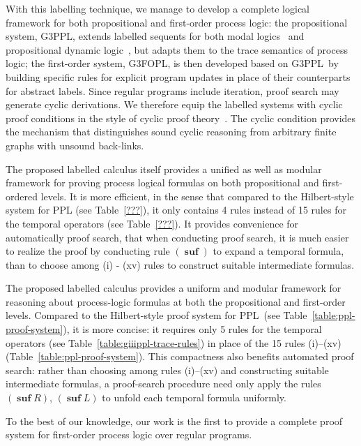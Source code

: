 \documentclass[manuscript,screen]{acmart}
\newcommand{\GiiiPPL}[0]{\mbox{G3PPL}}
\newcommand{\GiiiFOPL}[0]{\mbox{G3FOPL}}
\DeclareMathOperator{\osuf}{\mathbf{suf}}
\newcommand{\PPL}[0]{\mbox{PPL}}
\begin{document}
With this labelling technique, we manage to develop a complete logical framework for both propositional and first-order process logic: the propositional system, \GiiiPPL, extends labelled sequents for both modal logics~\cite{Negri05} and propositional dynamic logic~\cite{Docherty19}, but adapts them to the trace semantics of process logic; the first-order system, \GiiiFOPL, is then developed based on \GiiiPPL\ by building specific rules for explicit program updates in place of their counterparts for abstract labels. 
Since regular programs include iteration, proof search may generate cyclic derivations.  We therefore equip the labelled systems with cyclic proof conditions in the style of cyclic proof theory~\cite{Stirling91,Brotherston07,Brotherston08}.  The cyclic condition provides the mechanism that distinguishes sound cyclic reasoning from arbitrary finite graphs with unsound back-links. 

\ifx
The proposed labelled calculus itself provides a unified as well as modular framework for proving process logical formulas on both propositional and first-ordered levels. 
It is more efficient, in the sense that compared to the Hilbert-style system for PPL (see Table~\ref{???}), it only contains 4 rules instead of 15 rules for the temporal operators (see Table~\ref{???}). 
It provides convenience for automatically proof search, that when conducting proof search, it is much easier to realize the proof by conducting rule $(\osuf)$ to expand a temporal formula, than to choose among (i) - (xv) rules to construct suitable intermediate formulas. 
\fi

The proposed labelled calculus provides a uniform and modular framework for reasoning about process-logic formulas at both the propositional and first-order levels.  Compared to the Hilbert-style proof system for \PPL\ (see Table~\ref{table:ppl-proof-system}), it is more concise: it requires only 5 rules for the temporal operators (see Table~\ref{table:giiippl-trace-rules}) in place of the 15 rules (i)--(xv) (Table~\ref{table:ppl-proof-system}).  This compactness also benefits automated proof search: rather than choosing among rules (i)--(xv) and constructing suitable intermediate formulas, a proof-search procedure need only apply the rules $(\osuf R)$, $(\osuf L)$ to unfold each temporal formula uniformly. 


To the best of our knowledge, our work is the first to provide a complete proof system for first-order process logic over regular programs. 
\end{document}
